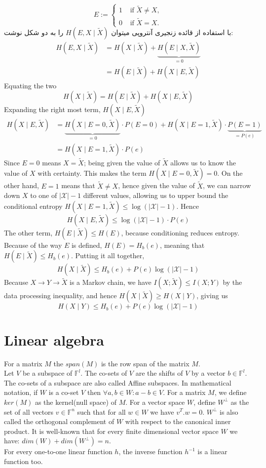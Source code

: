 $$
E:= \begin{cases}1 & \text { if } \tilde{X} \neq X, \\ 0 & \text { if } \tilde{X}=X .\end{cases}
$$
با استفاده از قائده زنجیری آنتروپی میتوان
$ H(E, X \mid \tilde{X})$
را به دو شکل نوشت:
$$
\begin{aligned}
    H(E, X \mid \tilde{X}) &=H(X \mid \tilde{X})+\underbrace{H(E \mid X, \tilde{X})}_{=0} \\
    &=H(E \mid \tilde{X})+H(X \mid E, \tilde{X})
\end{aligned}
$$
Equating the two
$$
H(X \mid \tilde{X})=H(E \mid \tilde{X})+H(X \mid E, \tilde{X})
$$
Expanding the right most term, $H(X \mid E, \tilde{X})$
$$
\begin{aligned}
    H(X \mid E, \tilde{X}) &=\underbrace{H(X \mid E=0, \tilde{X})}_{=0} \cdot P(E=0)+H(X \mid E=1, \tilde{X}) \cdot \underbrace{P(E=1)}_{=P(e)} \\
    &=H(X \mid E=1, \tilde{X}) \cdot P(e)
\end{aligned}
$$
Since $E=0$ means $X=\tilde{X}$; being given the value of $\tilde{X}$ allows us to know the value of $X$ with certainty. This makes the term $H(X \mid E=0, \tilde{X})=0$. On the other hand, $E=1$ means that $\tilde{X} \neq X$, hence given the value of $\tilde{X}$, we can narrow down $X$ to one of $|\mathcal{X}|-1$ different values, allowing us to upper bound the conditional entropy $H(X \mid E=1, \tilde{X}) \leq \log (|\mathcal{X}|-1)$. Hence
$$
H(X \mid E, \tilde{X}) \leq \log (|\mathcal{X}|-1) \cdot P(e)
$$
The other term, $H(E \mid \tilde{X}) \leq H(E)$, because conditioning reduces entropy. Because of the way $E$ is defined, $H(E)=H_b(e)$, meaning that $H(E \mid \tilde{X}) \leq H_b(e)$. Putting it all together,
$$
H(X \mid \tilde{X}) \leq H_b(e)+P(e) \log (|\mathcal{X}|-1)
$$
Because $X \rightarrow Y \rightarrow \tilde{X}$ is a Markov chain, we have $I(X ; \tilde{X}) \leq I(X ; Y)$ by the data processing inequality, and hence $H(X \mid \tilde{X}) \geq H(X \mid Y)$, giving us
$$
H(X \mid Y) \leq H_b(e)+P(e) \log (|\mathcal{X}|-1)
$$


\section{Linear algebra}
For a matrix $M$ the $span(M)$ is the row span of the matrix $M$.\\
Let $V$ be a subspace of $\mathbb{F}^l$. The co-sets of $V$ are the shifts of $V$ by a vector $b\in\mathbb{F}^l$. The co-sets of a subspace are also called Affine subspaces. In mathematical notation, if $W$ is a co-set $V$ then $  \forall a, b \in W: a - b \in V$.
For a matrix $M$, we define $ker(M)$ as the kernel(null space) of $M$. For a vector space $W$, define $W^\bot$ as the set of all vectors $v\in \mathbb{F}^n$ such that for all $w\in W$ we have $v^T.w=0$. $W^\bot$ is also called the orthogonal complement of $W$ with respect to the canonical inner product. It is well-known that for every finite dimensional vector space $W$ we have: $dim(W) + dim(W^\bot) = n$.
\\
For every one-to-one linear function $h$, the inverse function $h^{-1}$ is a linear function too.

